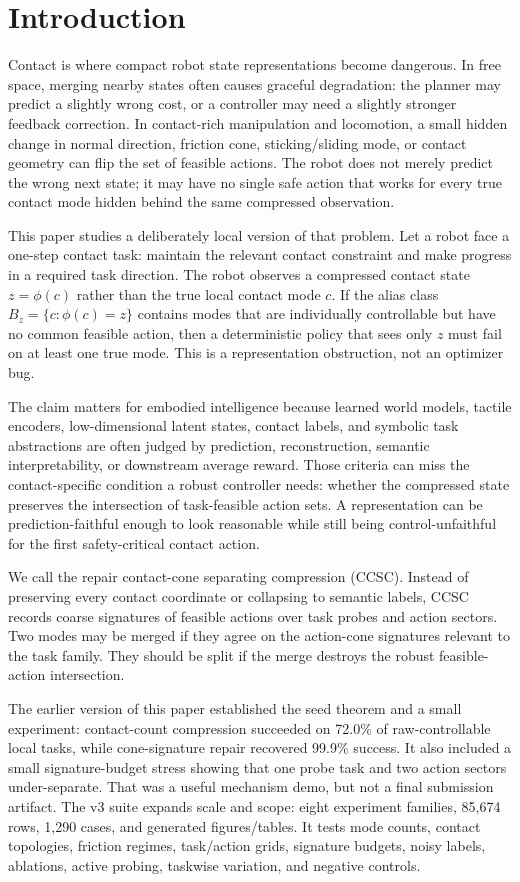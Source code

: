 \documentclass{article}
\newcommand{\compress}{\phi}
\newcommand{\alias}{B_z}
\begin{document}
\section{Introduction}
Contact is where compact robot state representations become dangerous. In free space, merging nearby states often causes graceful degradation: the planner may predict a slightly wrong cost, or a controller may need a slightly stronger feedback correction. In contact-rich manipulation and locomotion, a small hidden change in normal direction, friction cone, sticking/sliding mode, or contact geometry can flip the set of feasible actions. The robot does not merely predict the wrong next state; it may have no single safe action that works for every true contact mode hidden behind the same compressed observation.

This paper studies a deliberately local version of that problem. Let a robot face a one-step contact task: maintain the relevant contact constraint and make progress in a required task direction. The robot observes a compressed contact state $z=\compress(c)$ rather than the true local contact mode $c$. If the alias class $\alias=\{c:\compress(c)=z\}$ contains modes that are individually controllable but have no common feasible action, then a deterministic policy that sees only $z$ must fail on at least one true mode. This is a representation obstruction, not an optimizer bug.

The claim matters for embodied intelligence because learned world models, tactile encoders, low-dimensional latent states, contact labels, and symbolic task abstractions are often judged by prediction, reconstruction, semantic interpretability, or downstream average reward. Those criteria can miss the contact-specific condition a robust controller needs: whether the compressed state preserves the intersection of task-feasible action sets. A representation can be prediction-faithful enough to look reasonable while still being control-unfaithful for the first safety-critical contact action.

We call the repair contact-cone separating compression (CCSC). Instead of preserving every contact coordinate or collapsing to semantic labels, CCSC records coarse signatures of feasible actions over task probes and action sectors. Two modes may be merged if they agree on the action-cone signatures relevant to the task family. They should be split if the merge destroys the robust feasible-action intersection.

The earlier version of this paper established the seed theorem and a small experiment: contact-count compression succeeded on 72.0\% of raw-controllable local tasks, while cone-signature repair recovered 99.9\% success. It also included a small signature-budget stress showing that one probe task and two action sectors under-separate. That was a useful mechanism demo, but not a final submission artifact. The v3 suite expands scale and scope: eight experiment families, 85,674 rows, 1,290 cases, and generated figures/tables. It tests mode counts, contact topologies, friction regimes, task/action grids, signature budgets, noisy labels, ablations, active probing, taskwise variation, and negative controls.
\end{document}
